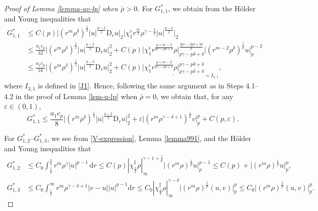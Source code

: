 \documentclass[11pt,reqno]{amsart}
\numberwithin{rk}{section}
\numberwithin{prop}{section}
\numberwithin{mydef}{section}
\numberwithin{lem}{section}
\numberwithin{equation}{section}
\numberwithin{thm}{section}
\begin{document}
\begin{proof}[Proof of Lemma \ref{lemma-uv-lp} when $\bar{\rho}>0$]
For $G^*_{1,1}$, we obtain from the H\"older and Young inequalities that 
\begin{equation*} 
\begin{aligned}
G^*_{1,1}&\leq C(p)\big|(r^m\rho^\delta)^{\frac12}|u|^{\frac{p-2}{2}}\mathrm{D}_r u\big|_2\big|\chi_1^\flat r^{\frac{m}{2}}\rho^{\gamma-\frac{\delta}{2}}|u|^{\frac{p-2}{2}}\big|_2\\
&\leq  \frac{a_1 c_p}{32}\big|(r^m\rho^\delta)^{\frac12}|u|^{\frac{p-2}{2}}\mathrm{D}_r u\big|_2^2+C(p)\big|\chi_1^\flat r^\frac{p+m-2}{p\gamma-p\delta+\delta} \rho\big|_{p\gamma-p\delta+\delta}^\frac{2p\gamma-2p\delta+2\delta}{p}\big|(r^{m-2}\rho^\delta)^\frac{1}{p}u\big|_{p}^{p-2}\\
&\leq \frac{a_1 c_p}{16}\big|(r^m\rho^\delta)^{\frac12}|u|^{\frac{p-2}{2}}\mathrm{D}_r u\big|_2^2+C(p) \underline{\big|\chi_1^\flat r^\frac{p+m-2}{p\gamma-p\delta+\delta} \rho\big|_{p\gamma-p\delta+\delta}^{p\gamma-p\delta+\delta}}_{=I_{3,1}},
\end{aligned}
\end{equation*}
where $I_{3,1}$ is defined in \eqref{J1}. Hence, following the same argument as in Steps 4.1--4.2 in the proof of Lemma \ref{lem-u-lp} when $\bar{\rho}=0$, we obtain that, for any $\varepsilon\in (0,1)$,
\begin{equation} 
G^*_{1,1}\leq \frac{a_1 c_p}{8}\big|(r^m\rho^\delta)^{\frac12}|u|^{\frac{p-2}{2}}\mathrm{D}_r u\big|_2^2+\varepsilon \big|(r^m\rho^{\gamma-\delta+1})^\frac{1}{p}v\big|_p^p+C(p,\varepsilon).
\end{equation}

For $G^*_{1,2}$--$G^*_{1,3}$, we see from \eqref{V-expression}, Lemma \ref{lemma991}, and the H\"older and Young inequalities that
\begin{equation*} 
\begin{aligned}
G^*_{1,2}&\leq C_0\int_\frac{1}{2}^\frac{3}{4}  r^m \rho^\gamma |u|^{p-1}\,\mathrm{d}r\leq C(p)|\chi_\frac{1}{2}^\sharp\rho|_\infty^{\gamma-1+\frac{1}{p}}\big|(r^m\rho)^\frac{1}{p}u\big|_p^{p-1}\leq C(p)+\big|(r^m\rho)^\frac{1}{p}u\big|_p^p,\\
G^*_{1,3}&\leq C_0 \int_\frac{1}{2}^\infty\!\! r^m \rho^{\gamma-\delta+1}|v-u||u|^{p-1}\mathrm{d}r \leq  C_0|\chi_\frac{1}{2}^\sharp \rho|_\infty^{\gamma-\delta} \big|(r^m\rho)^\frac{1}{p}(u,v)\big|_p^p\leq  C_0 \big|(r^m\rho)^\frac{1}{p}(u,v)\big|_p^p.
\end{aligned}
\end{equation*}


\end{proof}
\end{document}
